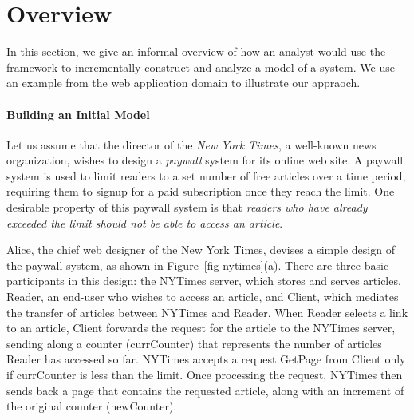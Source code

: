 
\section {Overview}
\label{sec-overview}

In this section, we give an informal overview of how an analyst would
use the framework to incrementally construct and analyze a model of a
system. We use an example from the web application domain to
illustrate our appraoch.

\paragraph{\textbf{Building an Initial Model}} Let us assume that the
director of the \textit{New York Times}, a well-known news organization,
wishes to design a \textit{paywall} system for its online web site. A
paywall system is used to limit readers to a set number of free
articles over a time period, requiring them to signup for a paid
subscription once they reach the limit.   One desirable
property of this paywall system is that \textit{readers who have
  already exceeded the limit should not be able to access an article}.

Alice, the chief web designer of the New York Times, devises a simple
design of the paywall system, as shown in
Figure~\ref{fig-nytimes}(a). There are three basic participants in this
design: the \textsf{NYTimes} server, which stores and serves articles,
\textsf{Reader}, an end-user who wishes to access an article, and
\textsf{Client}, which mediates the transfer of articles between
\textsf{NYTimes} and \textsf{Reader}. When \textsf{Reader} selects a
link to an article, \textsf{Client} forwards the request for the
article to the \textsf{NYTimes} server, sending along a counter
(\textsf{currCounter}) that represents the number of articles
\textsf{Reader} has accessed so far. \textsf{NYTimes} accepts a
request \textsf{GetPage} from \textsf{Client} only if
\textsf{currCounter} is less than the limit. Once processing the
request, \textsf{NYTimes} then sends back a page that contains the
requested article, along with an increment of the original counter
(\textsf{newCounter}).

